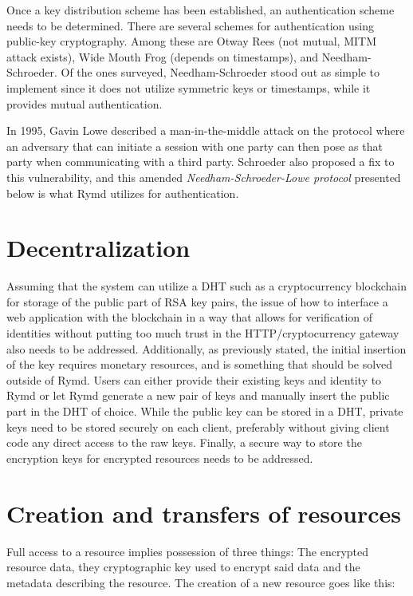 Once a key distribution scheme has been established, an authentication scheme needs to be determined. There are several schemes for authentication using public-key cryptography. Among these are Otway Rees (not mutual, MITM attack exists), Wide Mouth Frog (depends on timestamps), and Needham-Schroeder. Of the ones surveyed, Needham-Schroeder stood out as simple to implement since it does not utilize symmetric keys or timestamps, while it provides mutual authentication.

In 1995, Gavin Lowe described a man-in-the-middle attack on the protocol where an adversary that can initiate a session with one party can then pose as that party when communicating with a third party. Schroeder also proposed a fix to this vulnerability, and this amended \emph{Needham-Schroeder-Lowe protocol} presented below is what Rymd utilizes for authentication.


\section{Decentralization}
Assuming that the system can utilize a DHT such as a cryptocurrency blockchain for storage of the public part of RSA key pairs, the issue of how to interface a web application with the blockchain in a way that allows for verification of identities without putting too much trust in the HTTP/cryptocurrency gateway also needs to be addressed. Additionally, as previously stated, the initial insertion of the key requires monetary resources, and is something that should be solved outside of Rymd. Users can either provide their existing keys and identity to Rymd or let Rymd generate a new pair of keys and manually insert the public part in the DHT of choice.
While the public key can be stored in a DHT, private keys need to be stored securely on each client, preferably without giving client code any direct access to the raw keys. Finally, a secure way to store the encryption keys for encrypted resources needs to be addressed.

\section{Creation and transfers of resources}

Full access to a resource implies possession of three things: The encrypted resource data, they cryptographic key used to encrypt said data and the metadata describing the resource. The creation of a new resource goes like this:

